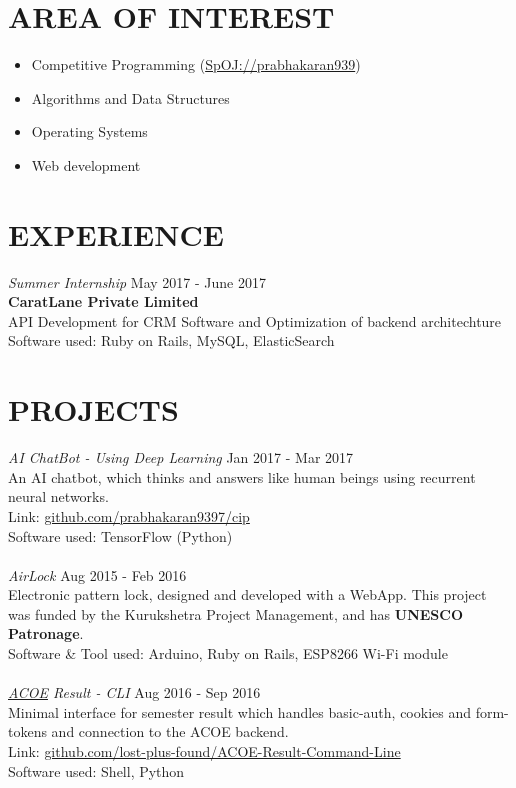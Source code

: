 \documentclass[margin, 10pt]{res} %
\begin{document}
\begin{resume}
\section{AREA OF INTEREST}
\begin{itemize}
\item Competitive Programming (\href{https://spoj.com/users/prabhakaran939}{SpOJ://prabhakaran939})
\item Algorithms and Data Structures
\item Operating Systems
\item Web development
\end{itemize}
\section{EXPERIENCE}
{\sl Summer Internship } \hfill May 2017 - June 2017 \\
{\bf CaratLane Private Limited} \\
API Development for CRM Software and Optimization of backend architechture \\
Software used: Ruby on Rails, MySQL, ElasticSearch
\section{PROJECTS}
{\sl AI ChatBot - Using Deep Learning} \hfill Jan 2017 - Mar 2017 \\
An AI chatbot, which thinks and answers like human beings using recurrent neural networks. \\
Link: \href{https://github.com/prabhakaran9397/cip}{github.com/prabhakaran9397/cip} \\
Software used: TensorFlow (Python) \\
\\
{\sl AirLock} \hfill Aug 2015 - Feb 2016 \\
Electronic pattern lock, designed and developed with a WebApp. This project was funded by the Kurukshetra Project Management, and has \textbf{UNESCO Patronage}.\\
Software \& Tool used: Arduino, Ruby on Rails, ESP8266 Wi-Fi module \\
\\
{\sl \href{acoe.annauniv.edu}{ACOE} Result - CLI} \hfill Aug 2016 - Sep 2016 \\
Minimal interface for semester result which handles basic-auth, cookies and form-tokens and connection to the ACOE backend.\\
Link: \href{https://github.com/lost-plus-found/ACOE-Result-Command-Line}{github.com/lost-plus-found/ACOE-Result-Command-Line} \\
Software used: Shell, Python

\end{resume}
\end{document}
